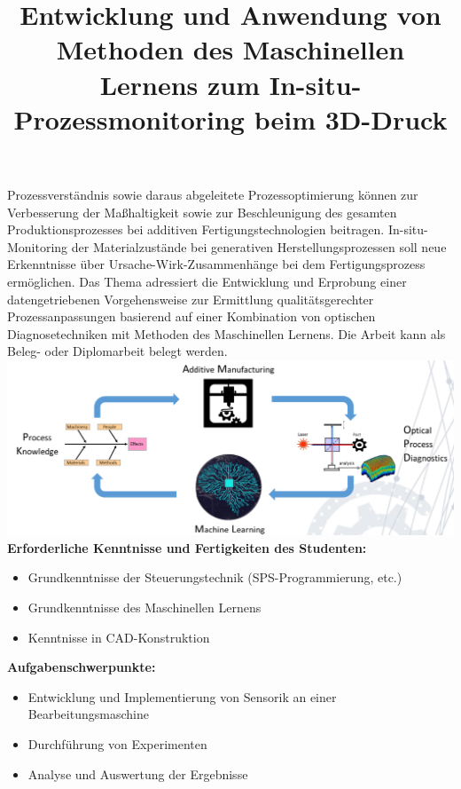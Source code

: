 \documentclass[11pt]{article}
\date{}
\begin{document}
\title{\textbf{Entwicklung und Anwendung von Methoden des
Maschinellen Lernens zum In-situ-Prozessmonitoring
beim 3D-Druck}}
\maketitle
\noindent
Prozessverständnis sowie daraus abgeleitete Prozessoptimierung können zur Verbesserung
der Maßhaltigkeit sowie zur Beschleunigung des gesamten Produktionsprozesses bei additiven
Fertigungstechnologien beitragen. In-situ-Monitoring der Materialzustände bei generativen
Herstellungsprozessen soll neue Erkenntnisse über Ursache-Wirk-Zusammenhänge bei dem
Fertigungsprozess ermöglichen. Das Thema adressiert die Entwicklung und Erprobung einer
datengetriebenen Vorgehensweise zur Ermittlung qualitätsgerechter Prozessanpassungen basierend
auf einer Kombination von optischen Diagnosetechniken mit Methoden des Maschinellen
Lernens. Die Arbeit kann als Beleg- oder Diplomarbeit belegt werden.\\

\includegraphics[scale=0.4]{DA.png}
\\

\noindent
\textbf{Erforderliche Kenntnisse und Fertigkeiten des Studenten:}
\begin{itemize}[itemsep=0pt,parsep=0pt]
\item Grundkenntnisse der Steuerungstechnik (SPS-Programmierung, etc.)
\item Grundkenntnisse des Maschinellen Lernens
\item Kenntnisse in CAD-Konstruktion
\end{itemize}

\noindent
\textbf{Aufgabenschwerpunkte:}
\begin{itemize}[itemsep=0pt,parsep=0pt]
\item Entwicklung und Implementierung von Sensorik an einer Bearbeitungsmaschine
\item Durchführung von Experimenten
\item Analyse und Auswertung der Ergebnisse
\end{itemize}
\end{document}
